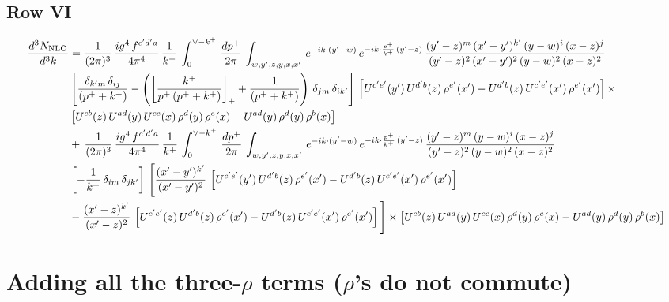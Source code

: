 \documentclass[9pt]{article}
\numberwithin{equation}{section}
\begin{document}
\subsection{Row VI}
\begin{align}
    \frac{d^{3}N_{\rm NLO}}{d^{3}k} & =  \frac{1}{(2\pi)^{3}}\, \frac{ig^{4}\,f^{c'd'a}}{4\pi^{4}}\, \frac{1}{k^{+}}\,\int_{0}^{\vee-k^{+}}\, \frac{dp^{+}}{2\pi}\, \int_{w,y',z,y,x,x'}\, e^{-ik\cdot (y'-w)}\, e^{-ik\cdot \frac{p^{+}}{k^{+}}\,(y'-z)}\,\frac{(y'-z)^{m}\,(x'-y')^{k'}\,(y-w)^{i}\,(x-z)^{j}}{(y'-z)^{2}\,(x'-y')^{2}\,(y-w)^{2}\,(x-z)^{2}}\notag \\ & \left[\frac{\delta_{k'm}\,\delta_{ij}}{(p^{+}+k^{+})}-\left(\left[\frac{k^{+}}{p^{+}\,(p^{+}+k^{+})}\right]_{+}+\frac{1}{(p^{+}+k^{+})}\right)\,\delta_{jm}\,\delta_{ik'}\right]\, \left[U^{c'e'}(y')\,U^{d'b}(z)\,\rho^{e'}(x')-U^{d'b}(z)\,U^{c'e'}(x')\,\rho^{e'}(x')\right]\times\notag \\ &  \left[U^{cb}(z)\,U^{ad}(y)\,U^{ce}(x)\,\rho^{d}(y)\,\rho^{e}(x)-U^{ad}(y)\,\rho^{d}(y)\,\rho^{b}(x)\right] \notag \\ &  +\,\frac{1}{(2\pi)^{3}}\, \frac{ig^{4}\,f^{c'd'a}}{4\pi^{4}}\, \frac{1}{k^{+}}\,\int_{0}^{\vee-k^{+}}\, \frac{dp^{+}}{2\pi}\, \int_{w,y',z,y,x,x'}\, e^{-ik\cdot (y'-w)}\, e^{-ik\cdot \frac{p^{+}}{k^{+}}\,(y'-z)}\,\frac{(y'-z)^{m}\,(y-w)^{i}\,(x-z)^{j}}{(y'-z)^{2}\,(y-w)^{2}\,(x-z)^{2}}\notag \\ &  \left[-\frac{1}{k^{+}}\, \delta_{im}\, \delta_{jk'}\right]\, \Bigg[\frac{(x'-y')^{k'}}{(x'-y')^{2}}\,\left[U^{c'e'}(y')\,U^{d'b}(z)\,\rho^{e'}(x')-U^{d'b}(z)\,U^{c'e'}(x')\,\rho^{e'}(x')\right]\notag \\ & -\frac{(x'-z)^{k'}}{(x'-z)^{2}}\,\left[U^{c'e'}(z)\,U^{d'b}(z)\,\rho^{e'}(x')-U^{d'b}(z)\,U^{c'e'}(x')\,\rho^{e'}(x')\right]\Bigg]\times    \left[U^{cb}(z)\,U^{ad}(y)\,U^{ce}(x)\,\rho^{d}(y)\,\rho^{e}(x)-U^{ad}(y)\,\rho^{d}(y)\,\rho^{b}(x)\right]
\end{align}

\section{Adding all the three-$\rho$ terms ($\rho$'s do not commute)}
\end{document}
